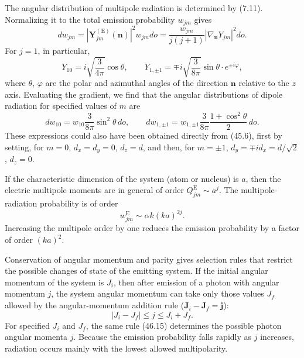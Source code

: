 The angular distribution of multipole radiation is determined by (7.11). Normalizing it to the total emission probability $w_{jm}$ gives
\begin{equation}
dw_{jm}=|\mathbf Y_{jm}^{(\mathrm E)}(\mathbf n)|^2w_{jm}do
=\frac{w_{jm}}{j(j+1)}|\nabla_{\mathbf n}Y_{jm}|^2do.
\tag{46.12}
\end{equation}
For $j=1$, in particular,
\[
Y_{10}=i\sqrt{\frac3{4\pi}}\cos\theta,
\qquad
Y_{1,\pm1}=\mp i\sqrt{\frac3{8\pi}}\sin\theta\cdot e^{\pm i\varphi},
\]
where $\theta$, $\varphi$ are the polar and azimuthal angles of the direction $\mathbf n$ relative to the $z$ axis. Evaluating the gradient, we find that the angular distributions of dipole radiation for specified values of $m$ are
\begin{equation}
dw_{10}=w_{10}\frac3{8\pi}\sin^2\theta\,do,
\qquad
dw_{1,\pm1}=w_{1,\pm1}\frac3{8\pi}\frac{1+\cos^2\theta}{2}\,do.
\tag{46.13}
\end{equation}
These expressions could also have been obtained directly from (45.6), first by setting, for $m=0$, $d_x=d_y=0$, $d_z=d$, and then, for $m=\pm1$, $d_y=\mp id_x=d/\sqrt2$, $d_z=0$.

If the characteristic dimension of the system (atom or nucleus) is $a$, then the electric multipole moments are in general of order $Q_{jm}^{\mathrm E}\sim a^j$. The multipole-radiation probability is of order
\begin{equation}
w_{jm}^{\mathrm E}\sim\alpha k(ka)^{2j}.
\tag{46.14}
\end{equation}
Increasing the multipole order by one reduces the emission probability by a factor of order $(ka)^2$.

Conservation of angular momentum and parity gives selection rules that restrict the possible changes of state of the emitting system. If the initial angular momentum of the system is $J_i$, then after emission of a photon with angular momentum $j$, the system angular momentum can take only those values $J_f$ allowed by the angular-momentum addition rule ($\mathbf J_i-\mathbf J_f=\mathbf j$):
\begin{equation}
|J_i-J_f|\leq j\leq J_i+J_f.
\tag{46.15}
\end{equation}
For specified $J_i$ and $J_f$, the same rule (46.15) determines the possible photon angular momenta $j$. Because the emission probability falls rapidly as $j$ increases, radiation occurs mainly with the lowest allowed multipolarity.

